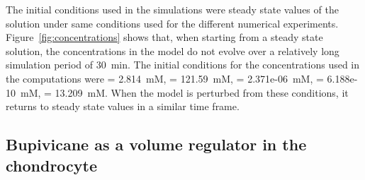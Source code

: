 The initial conditions used in the simulations were steady
state values of the solution under same conditions used for the
different numerical experiments. Figure~\ref{fig:concentrations} shows
that, when starting from a steady state solution, the concentrations
in the model do not evolve over a relatively long simulation period of
30~min. The initial conditions for the concentrations used in the
computations were \Nai = 2.814~mM, \Ki = 121.59~mM, \Cai =
2.371e-06~mM, \Hi = 6.188e-10~mM, \Cli = 13.209~mM. When the model is
perturbed from these conditions, it returns to steady state values in
a similar time frame.

\subsection*{Bupivicane as a volume regulator in the chondrocyte}

